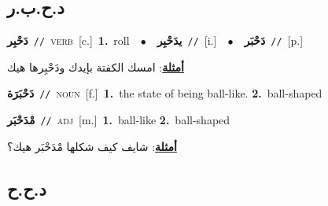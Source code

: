 \documentclass[10pt,a4paper,twoside]{article} %
\begin{document}
\begin{multicols}{2}
{{{{{{{{{{{\vspace{-3mm}
\subsection*{\color{blue}\foreignlanguage{arabic}{د.ح.ب.ر}\color{blue}{}} 

{\setlength\topsep{0pt}\textbf{\foreignlanguage{arabic}{دَحْبِر}}\ {\color{gray}\texttt{//}\color{black}}\ \textsc{verb}\ [c.]\ \textbf{1.}~roll\ \ $\bullet$\ \ \setlength\topsep{0pt}\textbf{\foreignlanguage{arabic}{يدَحْبِر}}\ {\color{gray}\texttt{//}\color{black}}\ [i.]\ \ $\bullet$\ \ \setlength\topsep{0pt}\textbf{\foreignlanguage{arabic}{دَحْبَر}}\ {\color{gray}\texttt{//}\color{black}}\ [p.]\  \begin{flushright}\color{gray}\foreignlanguage{arabic}{\textbf{\underline{\foreignlanguage{arabic}{أمثلة}}}: امسك الكفتة بإيدك ودَحْبِرها هيك}\end{flushright}\color{black}} \vspace{2mm}

{\setlength\topsep{0pt}\textbf{\foreignlanguage{arabic}{دَحْبَرَة}}\ {\color{gray}\texttt{//}\color{black}}\ \textsc{noun}\ [f.]\ \textbf{1.}~the state of being ball-like.  \textbf{2.}~ball-shaped\ 

{\setlength\topsep{0pt}\textbf{\foreignlanguage{arabic}{مْدَحْبَر}}\ {\color{gray}\texttt{//}\color{black}}\ \textsc{adj}\ [m.]\ \textbf{1.}~ball-like  \textbf{2.}~ball-shaped\  \begin{flushright}\color{gray}\foreignlanguage{arabic}{\textbf{\underline{\foreignlanguage{arabic}{أمثلة}}}: شايف كيف شكلها مْدَحْبَر هيك؟}\end{flushright}\color{black}} \vspace{2mm}

\vspace{-3mm}
\subsection*{\color{blue}\foreignlanguage{arabic}{د.ح.ح}\color{blue}{}} 

}}}}}}}}}}}}
\end{multicols}
\end{document}
